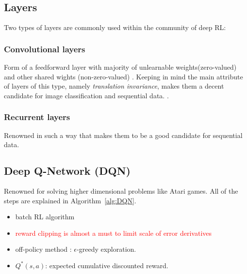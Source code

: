 \documentclass[a4paper,12pt]{article}
\begin{document}
\subsection{Layers}
Two types of layers are commonly used within the community of deep RL:

\subsubsection{Convolutional layers}
Form of a feedforward layer with majority of unlearnable weights(zero-valued) and other shared wights (non-zero-valued) \cite{Francois-Lavet2018}. Keeping in mind the main attribute of layers of this type, namely \textit{translation invariance}, makes them a decent candidate for image classification and sequential data. \cite{lecun1995a, Francois-Lavet2018}.

\subsubsection{Recurrent layers}
Renowned in such a way that makes them to be a good candidate for sequential data.


\subsection{Deep Q-Network (DQN)}
Renowned for solving higher dimensional problems like Atari games. All of the steps are explained in Algorithm~\ref{alg:DQN}.

\begin{itemize}
    \item batch RL algorithm
    \item \textcolor{red}{reward clipping is almost a must to limit scale of error derivatives} \cite{Francois-Lavet2018}
    \item off-policy method \cite{Huang2017}: $\epsilon$-greedy exploration.
    \item $Q^{*}(s,a)$: expected cumulative discounted reward.

\end{itemize}
\end{document}
